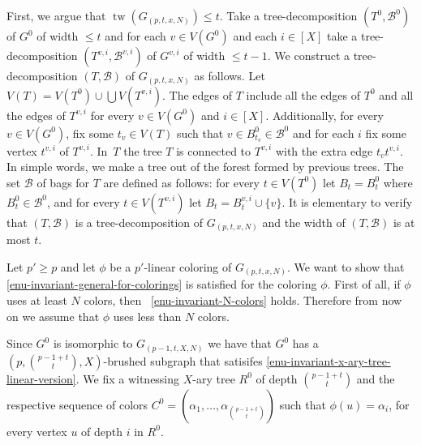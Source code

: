 \documentclass[11pt]{article}
\begin{document}
First, we argue that $\operatorname{tw}(G_{(p,t,x,N)})\leq t$. Take a tree-decomposition
$(T^0,\mathcal{B}^0)$ of $G^0$ of width $\leq t$ and for each $v\in V(G^0)$ and each
$i\in[X]$ take a tree-decomposition $(T^{v,i},\mathcal{B}^{v,i})$ of $G^{v,i}$ of
width $\leq t-1$.  We construct a tree-decomposition $(T,\mathcal{B})$ of
$G_{(p,t,x,N)}$ as follows.  Let $V(T)= V(T^0)\cup\bigcup V(T^{v,i})$.  The
edges of $T$ include all the edges of $T^0$ and all the edges of $T^{v,i}$ for
every $v\in V(G^0)$ and $i\in[X]$.  Additionally, for every $v\in V(G^0)$, fix
some $t_v\in V(T)$ such that $v\in B^0_{t_v}\in\mathcal{B}^0$ and for each $i$ fix
some vertex $t^{v,i}$ of $T^{v,i}$.  In~$T$ the tree $T$ is connected to
$T^{v,i}$ with the extra edge $t_v t^{v,i}$. In simple words, we make a tree
out of the forest formed by previous trees.  The set $\mathcal{B}$ of bags for $T$
are defined as follows: for every $t\in V(T^0)$ let $B_t = B^0_t$ where
$B^0_t \in \mathcal{B}^0$, and for every $t \in V(T^{v,i})$ let
$B_t = B^{v,i}_t\cup\{v\}$.  It is elementary to verify that $(T,\mathcal{B})$ is
a tree-decomposition of $G_{(p,t,x,N)}$ and the width of $(T,\mathcal{B})$ is at
most $t$.

Let $p'\geq p$ and let $\phi$ be a $p'$-linear coloring of $G_{(p,t,x,N)}$.
We want to show that \eqref{enu-invariant-general-for-colorings} is satisfied for the coloring
$\phi$.  
First of all, if $\phi$ uses at least $N$ colors, then~ \eqref{enu-invariant-N-colors} holds.
Therefore from now on we assume that $\phi$ uses less than $N$ colors.

Since $G^0$ is isomorphic to $G_{(p-1,t,X,N)}$ we have that $G^0$ has a
$\left(p,\binom{p-1+t}{t},X\right)$-brushed subgraph that satisifes
\eqref{enu-invariant-x-ary-tree-linear-version}.  We fix a witnessing $X$-ary
tree $R^0$ of depth $\binom{p-1+t}{t}$ and the respective sequence of colors
$C^0=\left(\alpha_1,\ldots,\alpha_{\binom{p-1+t}{t}}\right)$ such that
$\phi(u)=\alpha_i$, for every 
vertex $u$ of depth $i$ in $R^0$.
\end{document}
